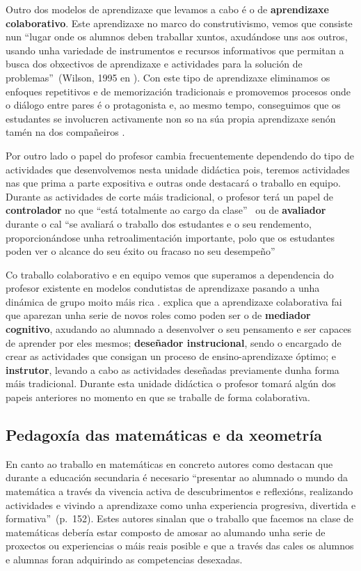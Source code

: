 Outro dos modelos de aprendizaxe que levamos a cabo é o de \textbf{aprendizaxe colaborativo}. Este aprendizaxe no marco do construtivismo, vemos que consiste nun  ``lugar onde os alumnos deben traballar xuntos, axudándose uns aos outros, usando unha variedade de instrumentos e recursos informativos que permitan a busca dos obxectivos de aprendizaxe e actividades para la solución de problemas''~(Wilson, 1995 en ). Con este tipo de aprendizaxe eliminamos os enfoques repetitivos e de memorización tradicionais e promovemos procesos onde o diálogo entre pares é o protagonista e, ao mesmo tempo, conseguimos que os estudantes se involucren activamente non so na súa propia aprendizaxe senón tamén na dos compañeiros \cite{calzadilla2002aprendizaje, collazos2001aprendizaje}.

Por outro lado o papel do profesor cambia frecuentemente dependendo do tipo de actividades que desenvolvemos nesta unidade didáctica pois, teremos actividades nas que prima a parte expositiva e outras onde destacará o traballo en equipo. Durante as actividades de corte máis tradicional, o profesor terá un papel de \textbf{controlador} no que ``está totalmente ao cargo da clase''~\cite[p.~5]{rubiogarciarolesextranjeros} ou de \textbf{avaliador} durante o cal ``se avaliará o traballo dos estudantes e o seu rendemento, proporcionándose unha retroalimentación importante, polo que os estudantes poden ver o alcance do seu éxito ou fracaso no seu desempeño''~\cite[p.~5]{rubiogarciarolesextranjeros}

Co traballo colaborativo e en equipo vemos que superamos a dependencia do profesor existente en modelos condutistas de aprendizaxe pasando a unha dinámica de grupo moito máis rica \cite{calzadilla2002aprendizaje}.  explica que a aprendizaxe colaborativa fai que aparezan unha serie de novos roles como poden ser o de \textbf{mediador cognitivo}, axudando ao alumnado a desenvolver o seu pensamento e ser capaces de aprender por eles mesmos; \textbf{deseñador instrucional}, sendo o encargado de crear as actividades que consigan un proceso de ensino-aprendizaxe óptimo; e \textbf{instrutor}, levando a cabo as actividades deseñadas previamente dunha forma máis tradicional. Durante esta unidade didáctica o profesor tomará algún dos papeis anteriores no momento en que se traballe de forma colaborativa.




\subsection{Pedagoxía das matemáticas e da xeometría}
En canto ao traballo en matemáticas en concreto autores como  destacan que durante a educación secundaria é necesario ``presentar ao alumnado o mundo da matemática a través da vivencia activa de descubrimentos e reflexións, realizando actividades e vivindo a aprendizaxe como unha experiencia progresiva, divertida e formativa''~(p.~152). Estes autores sinalan que o traballo que facemos na clase de matemáticas debería estar composto de amosar ao alumando unha serie de proxectos ou experiencias o máis reais posible e que a través das cales os alumnos e alumnas foran adquirindo as competencias desexadas.

